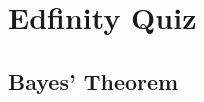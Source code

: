 \documentclass[slidestop,compress,mathserif]{beamer}
\makeatletter
\newcommand{\soln}[1]{\textit{#1}}
\newcommand{\solnGr}[1]{#1}
\def\chp3@path{../../Chp 3}
\makeatother
\begin{document}
\section{Edfinity Quiz}













\subsection{Bayes' Theorem}

\end{document}
